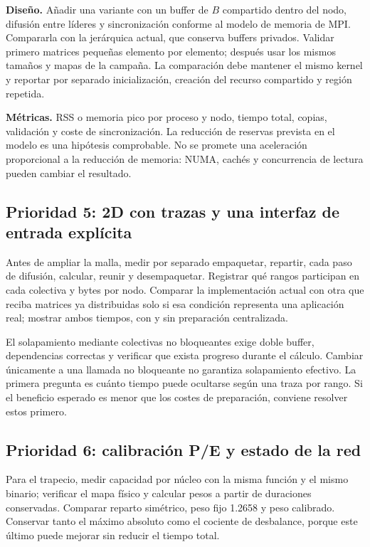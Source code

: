 \textbf{Diseño.} Añadir una variante con un buffer de $B$ compartido dentro del nodo, difusión entre líderes y sincronización conforme al modelo de memoria de MPI. Compararla con la jerárquica actual, que conserva buffers privados. Validar primero matrices pequeñas elemento por elemento; después usar los mismos tamaños y mapas de la campaña. La comparación debe mantener el mismo kernel y reportar por separado inicialización, creación del recurso compartido y región repetida.

\textbf{Métricas.} RSS o memoria pico por proceso y nodo, tiempo total, copias, validación y coste de sincronización. La reducción de reservas prevista en el modelo es una hipótesis comprobable. No se promete una aceleración proporcional a la reducción de memoria: NUMA, cachés y concurrencia de lectura pueden cambiar el resultado.

\subsection{Prioridad 5: 2D con trazas y una interfaz de entrada explícita}

Antes de ampliar la malla, medir por separado empaquetar, repartir, cada paso de difusión, calcular, reunir y desempaquetar. Registrar qué rangos participan en cada colectiva y bytes por nodo. Comparar la implementación actual con otra que reciba matrices ya distribuidas solo si esa condición representa una aplicación real; mostrar ambos tiempos, con y sin preparación centralizada.

El solapamiento mediante colectivas no bloqueantes exige doble buffer, dependencias correctas y verificar que exista progreso durante el cálculo. Cambiar únicamente a una llamada no bloqueante no garantiza solapamiento efectivo. La primera pregunta es cuánto tiempo puede ocultarse según una traza por rango. Si el beneficio esperado es menor que los costes de preparación, conviene resolver estos primero.

\subsection{Prioridad 6: calibración P/E y estado de la red}

Para el trapecio, medir capacidad por núcleo con la misma función y el mismo binario; verificar el mapa físico y calcular pesos a partir de duraciones conservadas. Comparar reparto simétrico, peso fijo 1.2658 y peso calibrado. Conservar tanto el máximo absoluto como el cociente de desbalance, porque este último puede mejorar sin reducir el tiempo total.

